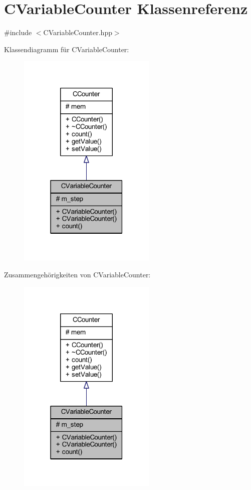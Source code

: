 \hypertarget{class_c_variable_counter}{}\section{C\+Variable\+Counter Klassenreferenz}
\label{class_c_variable_counter}


{\ttfamily \#include $<$C\+Variable\+Counter.\+hpp$>$}



Klassendiagramm für C\+Variable\+Counter\+:
\nopagebreak
\begin{figure}[H]
\begin{center}
\leavevmode
\includegraphics[width=187pt]{class_c_variable_counter__inherit__graph}
\end{center}
\end{figure}


Zusammengehörigkeiten von C\+Variable\+Counter\+:
\nopagebreak
\begin{figure}[H]
\begin{center}
\leavevmode
\includegraphics[width=187pt]{class_c_variable_counter__coll__graph}
\end{center}
\end{figure}
